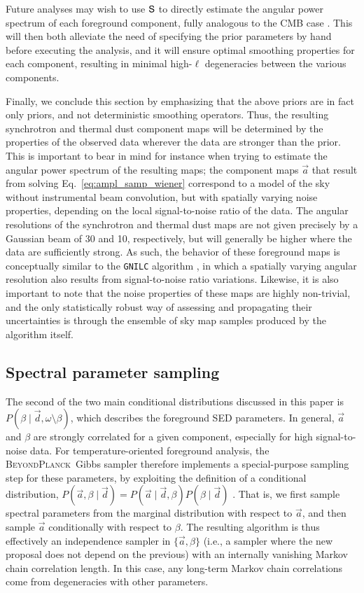 \documentclass[twocolumn]{aa}
\renewcommand{\d}[0]{\vec{d}}
\renewcommand{\a}[0]{\vec{a}}
\renewcommand{\S}[0]{\tens{S}}
\newcommand{\BP}{\textsc{BeyondPlanck}}
\newcommand{\?}[1]{\textcolor{red}{{\bf [#1]}}}
\begin{document}
Future analyses may wish to use $\S$ to directly estimate the
angular power spectrum of each foreground component, fully analogous to the CMB
case \citep{bp11,bp12}. This will then both alleviate the need of specifying the
prior parameters by hand before executing the analysis, and it will ensure
optimal smoothing properties for each component, resulting in minimal
high-$\ell$ degeneracies between the various components.

Finally, we conclude this section by emphasizing that the above priors are in
fact only priors, and not deterministic smoothing operators. Thus, the resulting
synchrotron and thermal dust component maps will be determined by the properties
of the observed data wherever the data are stronger than the prior.
This is important to bear in
mind for instance when trying to estimate the angular power spectrum of the
resulting maps; the component maps $\a$ that result from solving
Eq.~\eqref{eq:ampl_samp_wiener} correspond to a model of the sky without
instrumental beam convolution, but with spatially varying noise properties,
depending on the local signal-to-noise ratio of the data. The angular
resolutions of the synchrotron and thermal dust maps are not given
precisely by a Gaussian beam of 30 and 10\arcm, respectively, but will generally
be higher where the data are sufficiently strong. As such, the behavior of these
foreground maps is conceptually similar to the \texttt{GNILC} algorithm
\citep{Remazeilles2011b}, in which a spatially varying angular resolution also
results from signal-to-noise ratio variations. Likewise, it is also important to
note that the noise properties of these maps are highly non-trivial, and the
only statistically robust way of assessing and propagating their uncertainties
is through the ensemble of sky map samples produced by the algorithm itself.


\subsection{Spectral parameter sampling}

The second of the two main conditional distributions discussed in this paper is
$P(\beta\mid\d, \omega\setminus\beta)$, which describes the foreground SED
parameters. In general, $\a$ and $\beta$ are strongly correlated for a given
component, especially for high signal-to-noise data. For temperature-oriented
foreground analysis, the \BP\ Gibbs sampler therefore implements a
special-purpose sampling step for these parameters, by exploiting the definition
of a conditional distribution, $P(\a,\beta\mid\d) =
P(\a\mid\d,\beta)P(\beta\mid\d)$ \citep{stivoli:2010,bp01,bp13}. That is, we
first sample spectral parameters from the marginal distribution with respect to
$\a$, and then sample $\a$ conditionally with respect to $\beta$. The resulting
algorithm is thus effectively an independence sampler in $\{\a,\beta\}$ (i.e., a
sampler where the new proposal does not depend on the previous) with an internally
vanishing Markov chain correlation length. In this case, any long-term Markov
chain correlations come from degeneracies with other parameters.
\end{document}
